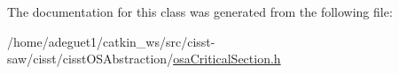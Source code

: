 The documentation for this class was generated from the following file\-:\begin{DoxyCompactItemize}
\item 
/home/adeguet1/catkin\-\_\-ws/src/cisst-\/saw/cisst/cisst\-O\-S\-Abstraction/\hyperlink{osa_critical_section_8h}{osa\-Critical\-Section.\-h}\end{DoxyCompactItemize}
